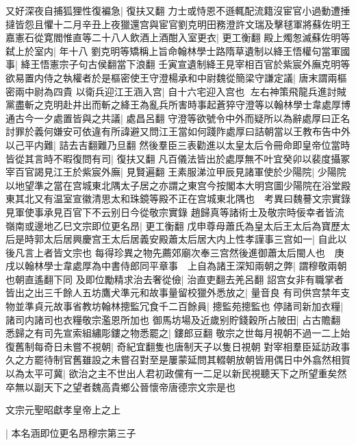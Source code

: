 又好深夜自捕狐狸性復褊急|{
	復扶又翻}
力士或恃恩不遜輒配流籍沒宦官小過動遭捶撻皆怨且懼十二月辛丑上夜獵還宫與宦官劉克明田務澄許文瑞及擊毬軍將蘇佐明王嘉憲石從寛閻惟直等二十八人飲酒上酒酣入室更衣|{
	更工衡翻}
殿上燭怱滅蘇佐明等弑上於室内|{
	年十八}
劉克明等矯稱上旨命翰林學士路隋草遺制以絳王悟權句當軍國事|{
	絳王悟憲宗子句古侯翻當下浪翻}
壬寅宣遺制絳王見宰相百官於紫宸外廡克明等欲易置内侍之執權者於是樞密使王守澄楊承和中尉魏從簡梁守謙定議|{
	唐末謂兩樞密兩中尉為四貴}
以衛兵迎江王涵入宫|{
	自十六宅迎入宫也}
左右神策飛龍兵進討賊黨盡斬之克明赴井出而斬之絳王為亂兵所害時事起蒼猝守澄等以翰林學士韋處厚博通古今一夕處置皆與之共議|{
	處昌呂翻}
守澄等欲號令中外而疑所以為辭處厚曰正名討罪於義何嫌安可依違有所諱避又問江王當如何踐阼處厚曰詰朝當以王教布告中外以己平内難|{
	詰去吉翻難乃旦翻}
然後羣臣三表勸進以太皇太后令冊命即皇帝位當時皆從其言時不暇復問有司|{
	復扶又翻}
凡百儀法皆出於處厚無不叶宜癸卯以裴度攝冢宰百官謁見江王於紫宸外廡|{
	見賢遍翻}
王素服涕泣甲辰見諸軍使於少陽院|{
	少陽院以地望準之當在宫城東北隅太子居之亦謂之東宫今按閣本大明宫圖少陽院在浴堂殿東其北又有温室宣徽清思太和珠鏡等殿不正在宫城東北隅也　考異曰魏謩文宗實錄見軍使事承見百官下不云别日今從敬宗實錄}
趙歸真等諸術士及敬宗時佞幸者皆流嶺南或邊地乙巳文宗即位更名昂|{
	更工衡翻}
戊申尊母蕭氏為皇太后王太后為寶歷太后是時郭太后居興慶宫王太后居義安殿蕭太后居大内上性孝謹事三宫如一|{
	自此以後凡言上者皆文宗也}
每得珍異之物先薦郊廟次奉三宫然後進御蕭太后閩人也　庚戌以翰林學士韋處厚為中書侍郎同平章事　上自為諸王深知兩朝之弊|{
	謂穆敬兩朝也朝直遙翻下同}
及即位勵精求治去奢從儉|{
	治直吏翻去羌呂翻}
詔宫女非有職掌者皆出之出三千餘人五坊鷹犬準元和故事量留校獵外悉放之|{
	量音良}
有司供宫禁年支物並準貞元故事省教坊翰林摠監冗食千二百餘員|{
	摠監苑摠監也}
停諸司新加衣糧|{
	諸司内諸司也衣糧敬宗濫恩所加也}
御馬坊場及近歲别貯錢穀所占陂田|{
	占古贍翻}
悉歸之有司先宣索組繡彫鏤之物悉罷之|{
	鏤郎豆翻}
敬宗之世每月視朝不過一二上始復舊制每奇日未嘗不視朝|{
	奇紀宜翻隻也唐制天子以隻日視朝}
對宰相羣臣延訪政事久之方罷待制官舊雖設之未嘗召對至是屢蒙延問其輟朝放朝皆用偶日中外翕然相賀以為太平可冀|{
	欲治之主不世出人君初政儻有一二足以新民視聽天下之所望重矣然卒無以副天下之望者魏高貴鄉公晉懷帝唐德宗文宗是也}


文宗元聖昭獻孝皇帝上之上

|{
	本名涵即位更名昂穆宗第三子}


